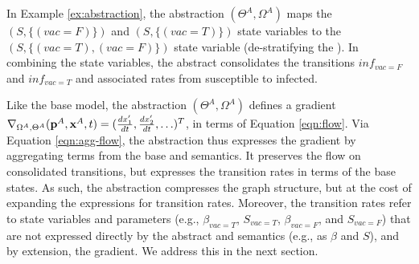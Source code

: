 In Example \ref{ex:abstraction}, the abstraction $(\Theta^{A}, \Omega^{A})$ maps the $(S, \{(vac=F)\})$ and $(S, \{(vac=T)\})$ state variables to the $(S, \{(vac=T), (vac=F)\})$ state variable (de-stratifying the \Petrinet{}).  In combining the state variables, the abstract \Petrinet{} consolidates the transitions $inf_{vac=F}$ and $inf_{vac=T}$ and associated rates from susceptible to infected.

Like the base model, the abstraction $(\Theta^{A}, \Omega^{A})$ defines a gradient $\nabla_{\Omega^{A}, \Theta^{A}}({\bf p}^{A}, {\bf x}^{A}, t) = (\frac{dx_1'}{dt},
	\frac{dx_2'}{dt}, \ldots)^T$, in terms of Equation \ref{eqn:flow}.
Via Equation \ref{eqn:agg-flow}, the abstraction thus expresses the gradient by aggregating terms from the
base \Petrinet{} and semantics.  It preserves the flow on consolidated transitions, but
expresses the transition rates in terms of the base states.  As such, the
abstraction compresses the \Petrinet{} graph structure, but at the cost of
expanding the expressions for transition rates. Moreover, the transition
rates refer to state variables and parameters (e.g., $\beta_{vac=T}$, $S_{vac=T}$, $\beta_{vac=F}$,  and $S_{vac=F}$) that are not expressed
directly by the abstract \Petrinet{} and semantics (e.g., as $\beta$ and $S$), and by extension, the gradient. We address this in the next section.

